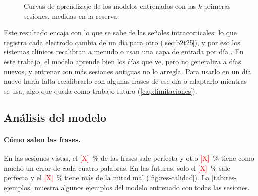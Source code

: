 \begin{figure}[htbp]
  \centering
  \caption{Curvas de aprendizaje de los modelos entrenados con las $k$ primeras sesiones, medidas en la reserva.}
  \label{fig:res-curvas-cronologico}
\end{figure}


Este resultado encaja con lo que se sabe de las señales intracorticales: lo que registra cada electrodo cambia de un día para otro (\cref{sec:b2t25}), y por eso los sistemas clínicos recalibran a menudo o usan una capa de entrada por día \cite{sussillo2016,fan2023corp}. En este trabajo, el modelo aprende bien los días que ve, pero no generaliza a días nuevos, y entrenar con más sesiones antiguas no lo arregla. Para usarlo en un día nuevo haría falta recalibrarlo con algunas frases de ese día o adaptarlo mientras se usa, algo que queda como trabajo futuro (\cref{cap:limitaciones}).

\subsection{Análisis del modelo}
\label{sec:res-analisis}


\paragraph{Cómo salen las frases.} En las sesiones vistas, el \textcolor{red}{[X]}~\% de las frases sale perfecta y otro \textcolor{red}{[X]}~\% tiene como mucho un error de cada cuatro palabras. En las futuras, solo el \textcolor{red}{[X]}~\% sale perfecta y el \textcolor{red}{[X]}~\% tiene más de la mitad mal (\cref{fig:res-calidad}). La \cref{tab:res-ejemplos} muestra algunos ejemplos del modelo entrenado con todas las sesiones.

